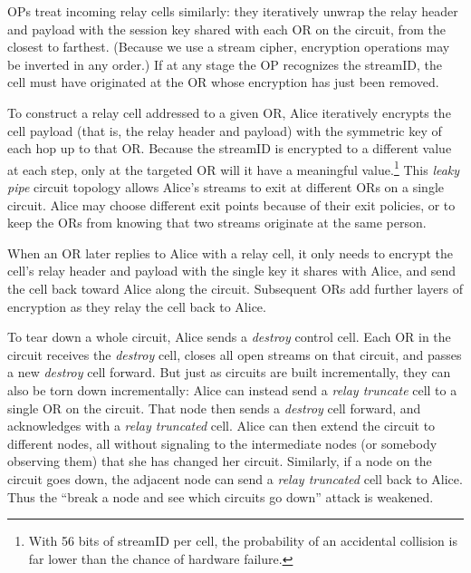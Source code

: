 \documentclass[times,10pt,twocolumn]{article}
\begin{document}
OPs treat incoming relay cells similarly: they iteratively unwrap the
relay header and payload with the session key shared with each
OR on the circuit, from the closest to farthest.  (Because we use a
stream cipher, encryption operations may be inverted in any order.)
If at any stage the OP recognizes the streamID, the cell must have
originated at the OR whose encryption has just been removed.

To construct a relay cell addressed to a given OR, Alice iteratively
encrypts the cell payload (that is, the relay header and payload) with
the symmetric key of each hop up to that OR.  Because the streamID is
encrypted to a different value at each step, only at the targeted OR
will it have a meaningful value.\footnote{
With 56 bits of streamID per cell, the probability of an accidental
collision is far lower than the chance of hardware failure.}
This \emph{leaky pipe} circuit topology
allows Alice's streams to exit at different ORs on a single circuit.  
Alice may choose different exit points because of their exit policies,
or to keep the ORs from knowing that two streams
originate at the same person.

When an OR later replies to Alice with a relay cell, it only needs to
encrypt the cell's relay header and payload with the single key it
shares with Alice, and send the cell back toward Alice along the
circuit.  Subsequent ORs add further layers of encryption as they
relay the cell back to Alice.

To tear down a whole circuit, Alice sends a \emph{destroy} control
cell. Each OR in the circuit receives the \emph{destroy} cell, closes
all open streams on that circuit, and passes a new \emph{destroy} cell
forward. But just as circuits are built incrementally, they can also
be torn down incrementally: Alice can instead send a \emph{relay
truncate} cell to a single OR on the circuit. That node then sends a
\emph{destroy} cell forward, and acknowledges with a
\emph{relay truncated} cell. Alice can then extend the circuit to
different nodes, all without signaling to the intermediate nodes (or
somebody observing them) that she has changed her circuit.
Similarly, if a node on the circuit goes down, the adjacent
node can send a \emph{relay truncated} cell back to Alice.  Thus the
``break a node and see which circuits go down'' attack
\cite{freedom21-security} is weakened.
\end{document}

